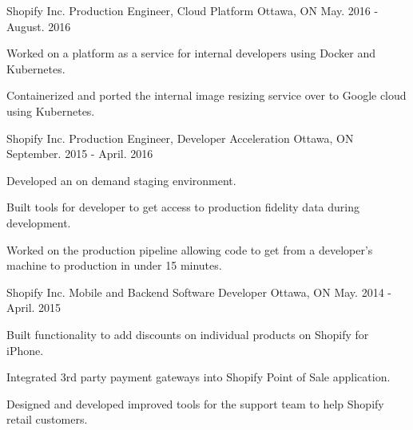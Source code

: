 

\begin{cventries}

  \cventry
    {Shopify Inc.} %
    {Production Engineer, Cloud Platform} %
    {Ottawa, ON} %
    {May. 2016 - August. 2016} %
    {
      \begin{cvitems} %
        \item {Worked on a platform as a service for internal developers using Docker and Kubernetes.}
        \item {Containerized and ported the internal image resizing service over to Google cloud using Kubernetes.}
      \end{cvitems}
    }
    
  \cventry
    {Shopify Inc.} %
    {Production Engineer, Developer Acceleration} %
    {Ottawa, ON} %
    {September. 2015 - April. 2016} %
    {
      \begin{cvitems} %
        \item {Developed an on demand staging environment.}
        \item {Built tools for developer to get access to production fidelity data during development.}
        \item {Worked on the production pipeline allowing code to get from a developer's machine to production in under 15 minutes.}
      \end{cvitems}
    }

  \cventry
    {Shopify Inc.} %
    {Mobile and Backend Software Developer} %
    {Ottawa, ON} %
    {May. 2014 - April. 2015} %
    {
      \begin{cvitems} %
        \item {Built functionality to add discounts on individual products on Shopify for iPhone.}
        \item {Integrated 3rd party payment gateways into Shopify Point of Sale application.}
        \item {Designed and developed improved tools for the support team to help Shopify retail customers.}
      \end{cvitems}
    } 
    

\end{cventries}
